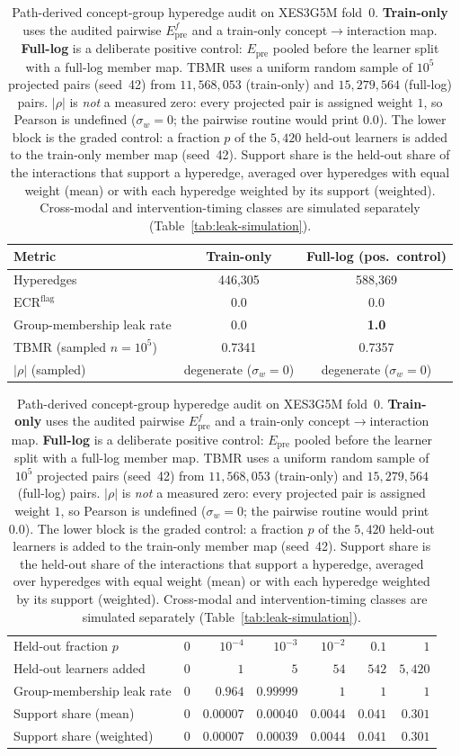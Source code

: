 ﻿%
\begin{table}[t]
\caption{Path-derived concept-group hyperedge audit on XES3G5M fold~0.
\textbf{Train-only} uses the audited pairwise $E_{\mathrm{pre}}^f$ and a
train-only concept$\rightarrow$interaction map. \textbf{Full-log} is a
deliberate positive control: $E_{\mathrm{pre}}$ pooled before the learner
split with a full-log member map.
TBMR uses a uniform random sample of $10^5$ projected pairs (seed~42)
from $11{,}568{,}053$ (train-only) and $15{,}279{,}564$ (full-log) pairs.
$|\rho|$ is \emph{not} a measured zero: every projected pair is assigned
weight $1$, so Pearson is undefined ($\sigma_w{=}0$; the pairwise routine
would print $0.0$). The lower block is the graded control: a fraction $p$
of the $5{,}420$ held-out learners is added to the train-only member map
(seed~42). Support share is the held-out share of the interactions that
support a hyperedge, averaged over hyperedges with equal weight (mean)
or with each hyperedge weighted by its support (weighted). Cross-modal and intervention-timing
classes are simulated separately (Table~\ref{tab:leak-simulation}).}
\label{tab:leakage-measured}
\centering
\footnotesize
\begin{tabularx}{\textwidth}{@{}Xcc@{}}
\toprule
Metric & Train-only & Full-log (pos.\ control) \\
\midrule
Hyperedges & 446{,}305 & 588{,}369 \\
$\mathrm{ECR}^{\mathrm{flag}}$ & 0.0 & 0.0 \\
Group-membership leak rate & 0.0 & \textbf{1.0} \\
TBMR (sampled $n{=}10^5$) & 0.7341 & 0.7357 \\
$|\rho|$ (sampled) & degenerate ($\sigma_w{=}0$) & degenerate ($\sigma_w{=}0$) \\
\bottomrule
\end{tabularx}

\medskip
\begin{tabular}{@{}lrrrrrr@{}}
\toprule
Held-out fraction $p$ & $0$ & $10^{-4}$ & $10^{-3}$ & $10^{-2}$ & $0.1$ & $1$ \\
Held-out learners added & $0$ & $1$ & $5$ & $54$ & $542$ & $5{,}420$ \\
\midrule
Group-membership leak rate & $0$ & $0.964$ & $0.99999$ & $1$ & $1$ & $1$ \\
Support share (mean) & $0$ & $0.00007$ & $0.00040$ & $0.0044$ & $0.041$ & $0.301$ \\
Support share (weighted) & $0$ & $0.00007$ & $0.00039$ & $0.0044$ & $0.041$ & $0.301$ \\
\bottomrule
\end{tabular}
\end{table}
